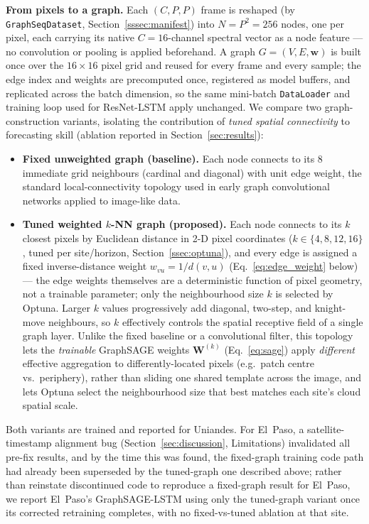 \textbf{From pixels to a graph.} Each $(C, P, P)$ frame is reshaped (by
\texttt{GraphSeqDataset}, Section~\ref{sssec:manifest}) into $N = P^2 = 256$
nodes, one per pixel, each carrying its native $C = 16$-channel spectral
vector as a node feature --- no convolution or pooling is applied beforehand.
A graph $G = (V, E, \mathbf{w})$ is built once over the $16\times16$ pixel
grid and reused for every frame and every sample; the edge index and weights
are precomputed once, registered as model buffers, and replicated across the
batch dimension, so the same mini-batch \texttt{DataLoader} and training loop
used for ResNet-LSTM apply unchanged. We compare two graph-construction
variants, isolating the contribution of \emph{tuned spatial connectivity}
to forecasting skill (ablation reported in Section~\ref{sec:results}):

\begin{itemize}
  \item \textbf{Fixed unweighted graph (baseline).} Each node connects to its
        8 immediate grid neighbours (cardinal and diagonal) with unit edge
        weight, the standard local-connectivity topology used in early graph
        convolutional networks applied to image-like data.
  \item \textbf{Tuned weighted $k$-NN graph (proposed).} Each node connects
        to its $k$ closest pixels by Euclidean distance in 2-D pixel
        coordinates ($k \in \{4,8,12,16\}$, tuned per site/horizon,
        Section~\ref{ssec:optuna}), and every edge is assigned a fixed
        inverse-distance weight $w_{vu} = 1/d(v,u)$
        (Eq.~\ref{eq:edge_weight} below) --- the edge weights themselves are
        a deterministic function of pixel geometry, not a trainable
        parameter; only the neighbourhood size $k$ is selected by Optuna.
        Larger $k$ values progressively add diagonal, two-step, and
        knight-move neighbours, so $k$ effectively controls the spatial
        receptive field of a single graph layer. Unlike the fixed baseline
        or a convolutional filter, this topology lets the \emph{trainable}
        GraphSAGE weights $\mathbf{W}^{(k)}$ (Eq.~\ref{eq:sage}) apply
        \emph{different} effective aggregation to differently-located pixels
        (e.g.\ patch centre vs.\ periphery), rather than sliding one shared
        template across the image, and lets Optuna select the neighbourhood
        size that best matches each site's cloud spatial scale.
\end{itemize}

Both variants are trained and reported for Uniandes. For El~Paso, a
satellite-timestamp alignment bug (Section~\ref{sec:discussion},
Limitations) invalidated all pre-fix results, and by the time this was
found, the fixed-graph training code path had already been superseded by
the tuned-graph one described above; rather than reinstate discontinued
code to reproduce a fixed-graph result for El~Paso, we report El~Paso's
GraphSAGE-LSTM using only the tuned-graph variant once its corrected
retraining completes, with no fixed-vs-tuned ablation at that site.

